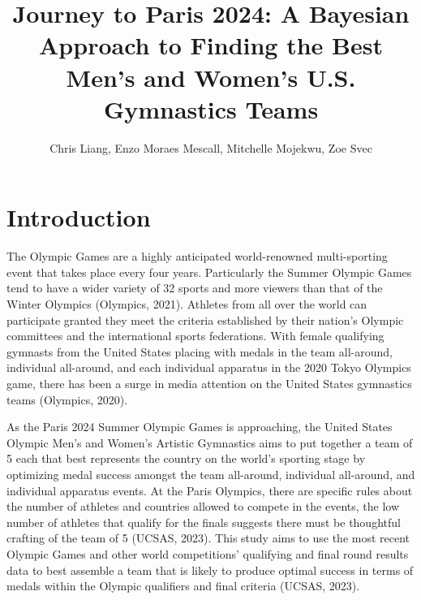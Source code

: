 \documentclass[
  10.5pt,
  letterpaper,
  DIV=11,
  numbers=noendperiod]{scrartcl}
\title{Journey to Paris 2024: A Bayesian Approach to Finding the Best
Men's and Women's U.S. Gymnastics Teams}
\author{Chris Liang, Enzo Moraes Mescall, Mitchelle Mojekwu, Zoe Svec}
\date{}
\begin{document}
\maketitle
\ifdefined\Shaded\renewenvironment{Shaded}{\begin{tcolorbox}[borderline west={3pt}{0pt}{shadecolor}, breakable, boxrule=0pt, frame hidden, sharp corners, interior hidden, enhanced]}{\end{tcolorbox}}\fi

\vspace{-20truemm}

\hypertarget{introduction}{%
\section{Introduction}\label{introduction}}

The Olympic Games are a highly anticipated world-renowned multi-sporting
event that takes place every four years. Particularly the Summer Olympic
Games tend to have a wider variety of 32 sports and more viewers than
that of the Winter Olympics (Olympics, 2021). Athletes from all over the
world can participate granted they meet the criteria established by
their nation's Olympic committees and the international sports
federations. With female qualifying gymnasts from the United States
placing with medals in the team all-around, individual all-around, and
each individual apparatus in the 2020 Tokyo Olympics game, there has
been a surge in media attention on the United States gymnastics teams
(Olympics, 2020).

As the Paris 2024 Summer Olympic Games is approaching, the United States
Olympic Men's and Women's Artistic Gymnastics aims to put together a
team of 5 each that best represents the country on the world's sporting
stage by optimizing medal success amongst the team all-around,
individual all-around, and individual apparatus events. At the Paris
Olympics, there are specific rules about the number of athletes and
countries allowed to compete in the events, the low number of athletes
that qualify for the finals suggests there must be thoughtful crafting
of the team of 5 (UCSAS, 2023). This study aims to use the most recent
Olympic Games and other world competitions' qualifying and final round
results data to best assemble a team that is likely to produce optimal
success in terms of medals within the Olympic qualifiers and final
criteria (UCSAS, 2023).
\end{document}
